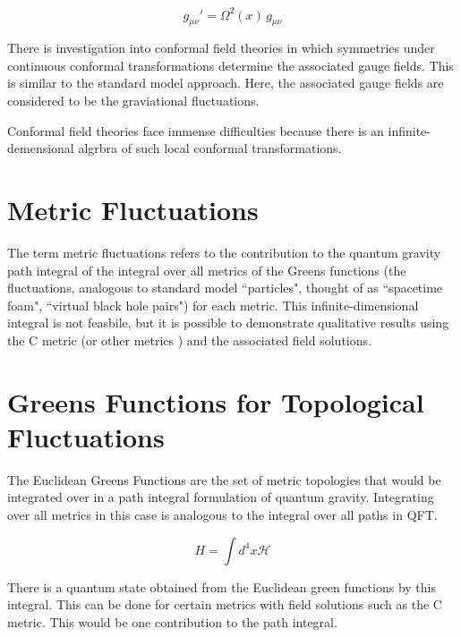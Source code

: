 \documentclass[%
 reprint,
 amsmath,amssymb,
 aps,
]{revtex4-1}
\begin{document}
\begin{equation}
g_{\mu \nu}' = \Omega^2 (x) \, g_{\mu \nu}
\end{equation}

There is investigation into conformal field theories in which symmetries under continuous conformal transformations determine the associated gauge fields. This is similar to the standard model approach. Here, the associated gauge fields are considered to be the graviational fluctuations.

Conformal field theories face immense difficulties because there is an infinite-demensional algrbra of such local conformal transformations. 

\section{Metric Fluctuations}

The term metric fluctuations refers to the contribution to the quantum gravity path integral of the integral over all metrics of the Greens functions (the fluctuations, analogous to standard model ``particles", thought of as ``spacetime foam", ``virtual black hole pairs") for each metric. This infinite-dimensional integral is not feasbile, but it is possible to demonstrate qualitative results using the C metric \cite{virtualblackholes} (or other metrics \cite{virtualfoam}) and the associated field solutions.

\section{Greens Functions for Topological Fluctuations}

The Euclidean Greens Functions are the set of metric topologies that would be integrated over in a path integral formulation of quantum gravity. Integrating over all metrics in this case is analogous to the integral over all paths in QFT.

\begin{equation}
H = \int d^4 x \mathcal{H} 
\end{equation}

There is a quantum state obtained from the Euclidean green functions by this integral. This can be done for certain metrics with field solutions such as the C metric. This would be one contribution to the path integral.

\end{document}
